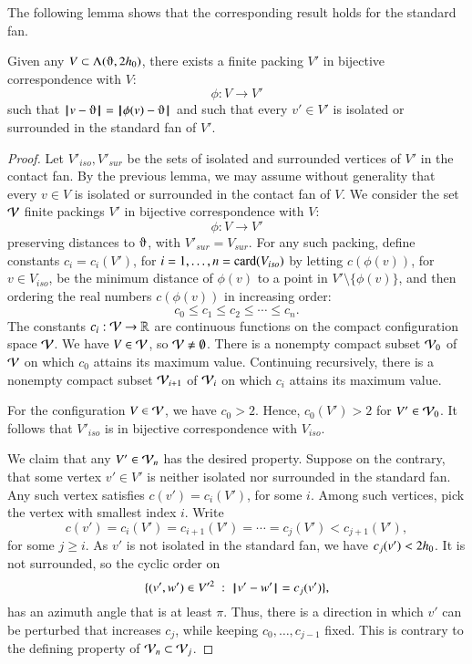 The following lemma shows that the corresponding result
holds for the standard fan.

\begin{lemma}\label{lemma:surrounded}  
Given any $V\subset \Lambda(\orgn,2\hm)$,
there exists a finite packing $V'$ 
in bijective correspondence with $V$:
$$
\phi:V\to V'
$$
such that $\norm{v}{\orgn} = \norm{\phi(v)}{\orgn}$ and
such that every $v'\in V'$
is isolated or surrounded in the standard fan of $V'$.
\end{lemma}

\begin{proof}  
Let $V'_{iso},V'_{sur}$ be the
sets of isolated and surrounded vertices of $V'$ in the contact
fan.
By the previous lemma, we may assume
without generality that every $v\in V$ is isolated
or surrounded in the contact fan of $V$.    
We consider the set ${\mathcal V}$ finite
packings $V'$ in bijective correspondence with $V$:
$$
\phi:V\to V'
$$
preserving distances to $\orgn$, with $V'_{sur}=V_{sur}$.
For any such packing, define constants $c_i=c_i(V')$,
for $i=1,\ldots,n={\operatorname{card}}(V_{iso})$ by letting 
$c(\phi(v))$, for $v\in V_{iso}$, 
be the minimum distance of $\phi(v)$ to a point
in $V'\setminus \{\phi(v)\}$, and then ordering the real numbers $c(\phi(v))$ in increasing order:
$$
c_0 \le c_1 \le c_2 \le \cdots \le c_n.
$$
The constants $c_i:{\mathcal V}\to\mathbb{R}$ are continuous functions on the compact configuration space ${\mathcal V}$.
We have $V\in {\mathcal V}$, so ${\mathcal V}\ne\emptyset$.
There is a nonempty 
compact subset ${\mathcal V}_0$ of ${\mathcal V}$ on which
$c_0$ attains its maximum value. Continuing recursively,
there is a nonempty compact subset ${\mathcal V}_{i+1}$ of
${\mathcal V}_{i}$ on which $c_i$ attains its maximum value.

For the configuration $V\in {\mathcal V}$, we have $c_0 >2$.
Hence, $c_0(V')>2$ for $V'\in{\mathcal V}_0$.  It follows
that $V'_{iso}$ is in bijective correspondence with
$V_{iso}$.

We claim that any $V'\in {\mathcal V}_n$ has the desired property.
Suppose on the contrary, that some vertex $v'\in V'$
is neither isolated nor surrounded in the standard fan.  
Any such vertex satisfies $c(v')=c_i(V')$, for some $i$.
Among such vertices, pick the vertex with smallest index
$i$.  Write 
$$
c(v') = c_i(V') = c_{i+1}(V') =\cdots= c_j(V') < c_{j+1}(V'),
$$
for some $j\ge i$.  As $v'$ is not isolated in the
standard fan, we have $c_j(v') < 2{h_0}$.  It is not surrounded,
so the cyclic order on
$$
\{(v',w')\in V'^2 \ :\  {\hskip0.1em|\hskip-0.15em|\hskip0.1em}v' - w'{\hskip0.1em|\hskip-0.15em|\hskip0.1em} = c_j(v')\},
$$
has an azimuth angle that is at least $\pi$.
Thus, there is a direction in which $v'$ can be perturbed
that increases $c_j$, while keeping $c_0,\ldots,c_{j-1}$
fixed.  This is contrary to the defining property of
${\mathcal V}_n\subset{\mathcal V}_j$.
\end{proof}


